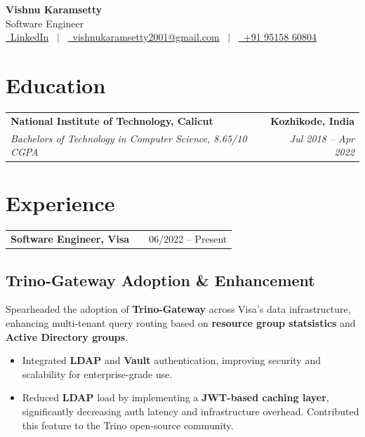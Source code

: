 \documentclass[a4paper,12pt]{article}
\makeatletter
\newenvironment{joblong}[2]
    {
    \begin{tabularx}{\linewidth}{@{}l X r@{}}
    \textbf{#1} & \hfill &  #2 \\[3.75pt]
    \end{tabularx}
    \begin{minipage}[t]{\linewidth}
    \begin{itemize}[nosep,after=\strut,leftmargin=1em,itemsep=3pt,label=$\bullet$]
    }
    {
    \end{itemize}
    \end{minipage}    
    }
\makeatother
\begin{document}
\pagestyle{empty} 

\begin{center}
    {\Huge \textbf{Vishnu Karamsetty}} \\[5pt]
    {\large Software Engineer} \\[7.5pt]
    \href{https://linkedin.com/in/}{\raisebox{-0.05\height}\faLinkedin\ LinkedIn} \ $|$ \ 
    \href{mailto:vishnukaramsetty2001@gmail.com}{\raisebox{-0.05\height}\faEnvelope\ vishnukaramsetty2001@gmail.com} \ $|$ \ 
    \href{tel:+919515860804}{\raisebox{-0.05\height}\faMobile\ +91 95158 60804}
\end{center}


\section{Education}
\begin{tabularx}{\linewidth}{@{}X r@{}}
\textbf{National Institute of Technology, Calicut} & \textbf{Kozhikode, India} \\
\textit{Bachelors of Technology in Computer Science, 8.65/10 CGPA} & \textit{Jul 2018 -- Apr 2022} \\
\end{tabularx}



\section{Experience}

\begin{joblong}{Software Engineer, Visa}{06/2022 – Present}
\end{joblong}

\subsection*{Trino-Gateway Adoption \& Enhancement}
Spearheaded the adoption of \textbf{Trino-Gateway} across Visa's data infrastructure, enhancing multi-tenant query routing based on \textbf{resource group statsistics} and \textbf{Active Directory groups}.
\begin{itemize}[nosep, leftmargin=1.5em, label=$\bullet$]
\item Integrated \textbf{LDAP} and \textbf{Vault} authentication, improving security and scalability for enterprise-grade use.
\item Reduced \textbf{LDAP} load by implementing a \textbf{JWT-based caching layer}, significantly decreasing auth latency and infrastructure overhead. Contributed this feature to the Trino open-source community.
\end{itemize}
\end{document}
